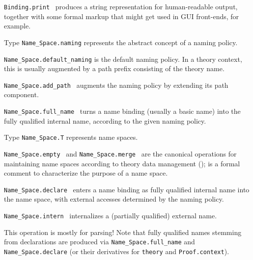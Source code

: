 \begin{isabellebody}
\begin{isamarkuptext}
\begin{description}
  \item \verb|Binding.print|~ produces a string
  representation for human-readable output, together with some formal
  markup that might get used in GUI front-ends, for example.

  \item Type \verb|Name_Space.naming| represents the abstract
  concept of a naming policy.

  \item \verb|Name_Space.default_naming| is the default naming policy.
  In a theory context, this is usually augmented by a path prefix
  consisting of the theory name.

  \item \verb|Name_Space.add_path|~ augments the
  naming policy by extending its path component.

  \item \verb|Name_Space.full_name|~ turns a
  name binding (usually a basic name) into the fully qualified
  internal name, according to the given naming policy.

  \item Type \verb|Name_Space.T| represents name spaces.

  \item \verb|Name_Space.empty|~ and \verb|Name_Space.merge|~ are the canonical operations for
  maintaining name spaces according to theory data management
  ();  is a formal comment
  to characterize the purpose of a name space.

  \item \verb|Name_Space.declare|~ enters a name binding as fully qualified internal name into
  the name space, with external accesses determined by the naming
  policy.

  \item \verb|Name_Space.intern|~ internalizes a
  (partially qualified) external name.

  This operation is mostly for parsing!  Note that fully qualified
  names stemming from declarations are produced via \verb|Name_Space.full_name| and \verb|Name_Space.declare|
  (or their derivatives for \verb|theory| and
  \verb|Proof.context|).


\end{description}
\end{isamarkuptext}
\end{isabellebody}
